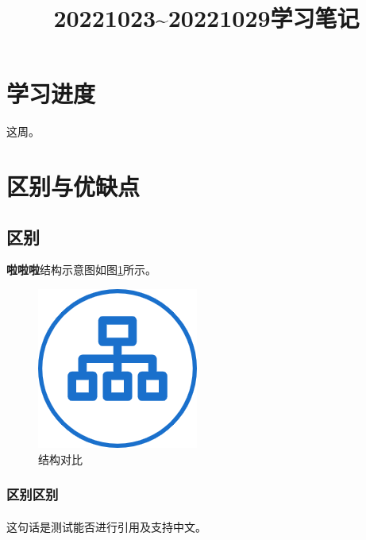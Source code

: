 \documentclass[12pt,a4paper,AutoFakeBold]{article} %
\title{\songti\zihao{3}\textbf{20221023\textasciitilde20221029学习笔记}} %
\author{}
\date{}
\newcommand{\upcite}[1]{\textsuperscript{\cite{#1}}} %
\begin{document}
	
	\thispagestyle{empty} %


	
	\tableofcontents
	
	\maketitle %
	\section{学习进度}

		这周。

	\newpage
	\section{区别与优缺点}
		\subsection{区别}

			{\bfseries\songti 啦啦啦}结构示意图如图\ref{pho:structure}所示。
		
			\begin{figure}[htbp]
				\centering
				\includegraphics[scale=0.6]{structure.png}
				\caption{结构对比}
				\label{pho:structure}
			\end{figure}

			\subsubsection{区别区别}

				这句话是测试能否进行引用及支持中文\upcite{1}。
\end{document}
